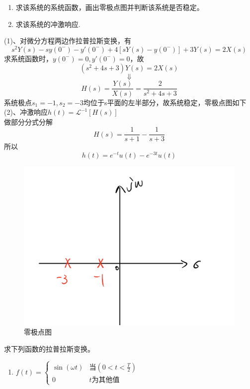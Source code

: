 \documentclass[answers]{exam}  %
\begin{document}
\begin{questions}
\begin{enumerate}[(1)]
\item 求该系统的系统函数，画出零极点图并判断该系统是否稳定。
\item 求该系统的冲激响应.
\end{enumerate}
\begin{solution}
(1)、对微分方程两边作拉普拉斯变换，有$$s^2Y(s)-sy(0^-)-y'(0^-)+4[sY(s)-y(0^-)]+3Y(s)=2X(s)$$
求系统函数时，$y(0^-)=0,y'(0^-)=0$，故
$$(s^2+4s+3)Y(s)=2X(s)$$
$$\Downarrow$$
$$H(s)=\frac{Y(s)}{X(s)}=\frac{2}{s^2+4s+3}$$
系统极点$s_1=-1,s_2=-3$均位于s平面的左半部分，故系统稳定，零极点图如下
~\\
(2)、冲激响应$h(t)=\mathcal{L}^{-1}[H(s)]$\\
做部分分式分解$$H(s)=\frac{1}{s+1}-\frac{1}{s+3}$$
所以$$h(t)=e^{-t}u(t)-e^{-3t}u(t)$$
\end{solution}
\begin{figure}[h]
	\centering
	\includegraphics[width=0.3\linewidth]{pics/p4-1.PNG}
	\caption{零极点图}
\end{figure}
\newpage
\question 求下列函数的拉普拉斯变换。
\begin{enumerate}[(1)]
\item $f(t)=\left\{\begin{matrix}
\sin(\omega t) & \text{当}\left(0<t<\frac{T}{2} \right )\\ 
 0& t\text{为其他值}
\end{matrix}\right.$


\end{enumerate}
\end{questions}
\end{document}

